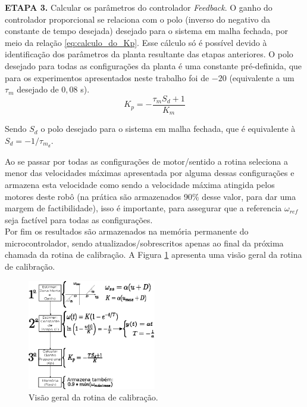 \textbf{ETAPA 3.} Calcular os parâmetros do controlador \textit{Feedback}. O ganho do controlador proporcional se relaciona com o polo (inverso do negativo da constante de tempo desejada) desejado para o sistema em malha fechada, por meio da relação \ref{eq:calculo_do_Kp}. Esse cálculo só é possível devido à identificação dos parâmetros da planta resultante das etapas anteriores. O polo desejado para todas as configurações da planta é uma constante pré-definida, que para os experimentos apresentados neste trabalho foi de $-20$ (equivalente a um $\tau_m$ desejado de $0,08$ s).\\

\begin{equation}
    K_p = -\frac{\tau_m S_d + 1}{K_m}
    \label{eq:calculo_do_Kp}
\end{equation}

Sendo $S_d$ o polo desejado para o sistema em malha fechada, que é equivalente à $S_d = -1/\tau_{m_{d}}$.
    

Ao se passar por todas as configurações de motor/sentido a rotina seleciona a menor das velocidades máximas apresentada por alguma dessas configurações e armazena esta velocidade como sendo a velocidade máxima atingida pelos motores deste robô (na prática são armazenados 90\% desse valor, para dar uma margem de factibilidade), isso é importante, para assegurar que a referencia $\omega_{ref}$ seja factível para todas as configurações. \\

Por fim os resultados são armazenados na memória permanente do microcontrolador, sendo atualizados/sobrescritos apenas ao final da próxima chamada da rotina de calibração. A Figura \ref{fig:rotina_calibracao} apresenta uma visão geral da rotina de calibração.

\begin{figure}[H]
    \centering
    \includegraphics[width=0.5\textwidth]{figuras/ilustracoes/rotina_de_calibracao.eps}
    \caption{Visão geral da rotina de calibração.}
    \label{fig:rotina_calibracao}
\end{figure}
